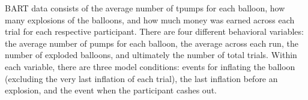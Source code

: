 \par \indent BART data consists of the average number of tpumps for each balloon, how many explosions of the balloons, and how much money was earned across each trial for each respective participant. There are four different behavioral variables: the average number of pumps for each balloon, the average across each run, the number of exploded balloons, and ultimately the number of total trials. Within each variable, there are three model conditions: events for inflating the balloon (excluding the very last inflation of each trial), the last inflation before an explosion, and the event when the participant cashes out.